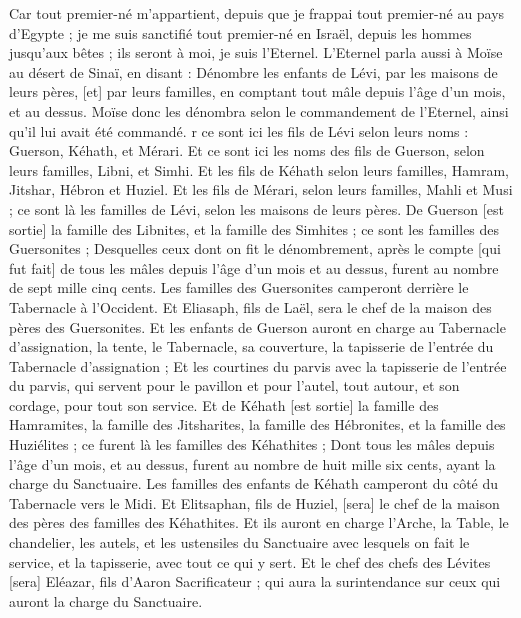 \begin{multicols}{2}
Car tout premier-né m'appartient, depuis que je frappai tout premier-né au pays d'Egypte ; je me suis sanctifié tout premier-né en Israël, depuis les hommes jusqu'aux bêtes ; ils seront à moi, je suis l'Eternel.
L'Eternel parla aussi à Moïse au désert de Sinaï, en disant :
Dénombre les enfants de Lévi, par les maisons de leurs pères, [et] par leurs familles, en comptant tout mâle depuis l'âge d'un mois, et au dessus.
Moïse donc les dénombra selon le commandement de l'Eternel, ainsi qu'il lui avait été commandé.
r ce sont ici les fils de Lévi selon leurs noms : Guerson, Kéhath, et Mérari.
Et ce sont ici les noms des fils de Guerson, selon leurs familles, Libni, et Simhi.
Et les fils de Kéhath selon leurs familles, Hamram, Jitshar, Hébron et Huziel.
Et les fils de Mérari, selon leurs familles, Mahli et Musi ; ce sont là les familles de Lévi, selon les maisons de leurs pères.
De Guerson [est sortie] la famille des Libnites, et la famille des Simhites ; ce sont les familles des Guersonites ;
Desquelles ceux dont on fit le dénombrement, après le compte [qui fut fait] de tous les mâles depuis l'âge d'un mois et au dessus, furent au nombre de sept mille cinq cents.
Les familles des Guersonites camperont derrière le Tabernacle à l'Occident.
Et Eliasaph, fils de Laël, sera le chef de la maison des pères des Guersonites.
Et les enfants de Guerson auront en charge au Tabernacle d'assignation, la tente, le Tabernacle, sa couverture, la tapisserie de l'entrée du Tabernacle d'assignation ;
Et les courtines du parvis avec la tapisserie de l'entrée du parvis, qui servent pour le pavillon et pour l'autel, tout autour, et son cordage, pour tout son service.
Et de Kéhath [est sortie] la famille des Hamramites, la famille des Jitsharites, la famille des Hébronites, et la famille des Huziélites ; ce furent là les familles des Kéhathites ;
Dont tous les mâles depuis l'âge d'un mois, et au dessus, furent au nombre de huit mille six cents, ayant la charge du Sanctuaire.
Les familles des enfants de Kéhath camperont du côté du Tabernacle vers le Midi.
Et Elitsaphan, fils de Huziel, [sera] le chef de la maison des pères des familles des Kéhathites.
Et ils auront en charge l'Arche, la Table, le chandelier, les autels, et les ustensiles du Sanctuaire avec lesquels on fait le service, et la tapisserie, avec tout ce qui y sert.
Et le chef des chefs des Lévites [sera] Eléazar, fils d'Aaron Sacrificateur ; qui aura la surintendance sur ceux qui auront la charge du Sanctuaire.

\end{multicols}
